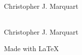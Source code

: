 \documentclass[11pt]{article}
\begin{document}
\centerline {\Large Christopher J. Marquart}		%
\\
\Large Christopher J. Marquart


\hfil Made with \LaTeX\ \hfil				%
\end{document}

